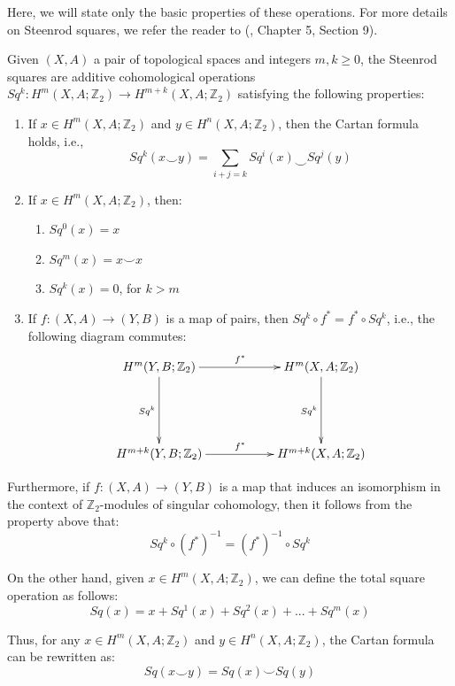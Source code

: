 \documentclass[12pt,oneside]{book}
\newcommand{\ds}{\displaystyle}
\newcommand{\Z}{\mathbb{Z}}
\newcommand{\ccup}{\smile}
\begin{document}
    Here, we will state only the basic properties of these operations. For more details on Steenrod squares, we refer the reader to 
    (\cite{spanier}, Chapter 5, Section 9).
    
    Given $(X,A)$ a pair of topological spaces and integers $m,k\geq 0$, the Steenrod squares are additive cohomological operations 
    $Sq^{k}:H^{m}(X,A;\Z_{2})\to H^{m+k}(X,A;\Z_{2})$ satisfying the following properties:
    
    \begin{enumerate}
        \item If $x\in H^{m}(X,A;\Z_{2})$ and $y\in H^{n}(X,A;\Z_{2})$, then the Cartan formula holds, i.e., 
        $$ Sq^{k}(x\ccup y)=\ds\sum_{i+j=k}Sq^{i}(x)\ccup Sq^{j}(y) $$	
        \item If $x\in H^{m}(X,A;\Z_{2})$, then: 
        \begin{enumerate}
            \item $Sq^{0}(x)=x$		
            \item $Sq^{m}(x)=x\ccup x$		
            \item $Sq^{k}(x)=0$, for $k>m$
        \end{enumerate}
        
        \item If $f:(X,A)\to (Y,B)$ is a map of pairs, then $Sq^{k}\circ f^{*}=f^{*}\circ Sq^{k}$, i.e., the following diagram commutes:
        $$\xymatrix @C=0.5cm {
            H^{m}(Y,B;\Z_{2}) \ar[rrr]^{f^{*}} \ar[dd]_{Sq^{k}} & & & H^{m}(X,A;\Z_{2}) \ar[dd]_{Sq^{k}} \\
            & & & \\
            H^{m+k}(Y,B;\Z_{2}) \ar[rrr]^{f^{*}} & & & H^{m+k}(X,A;\Z_{2})
        }$$ 
    \end{enumerate}
    
    Furthermore, if $f:(X,A)\to (Y,B)$ is a map that induces an isomorphism in the context of $\Z_{2}$-modules of singular cohomology, then 
    it follows from the property above that:
    $$ Sq^{k}\circ(f^{*})^{-1}=(f^{*})^{-1}\circ Sq^{k} $$
    
    On the other hand, given $x\in H^{m}(X,A;\Z_{2})$, we can define the total square operation as follows:
    $$ Sq(x)=x+Sq^{1}(x)+Sq^{2}(x)+...+Sq^{m}(x) $$
    
    Thus, for any $x\in H^{m}(X,A;\Z_{2})$ and $y\in H^{n}(X,A;\Z_{2})$, the Cartan formula can be rewritten as:
    $$ Sq(x\ccup y)=Sq(x)\ccup Sq(y) $$
    
\end{document}
